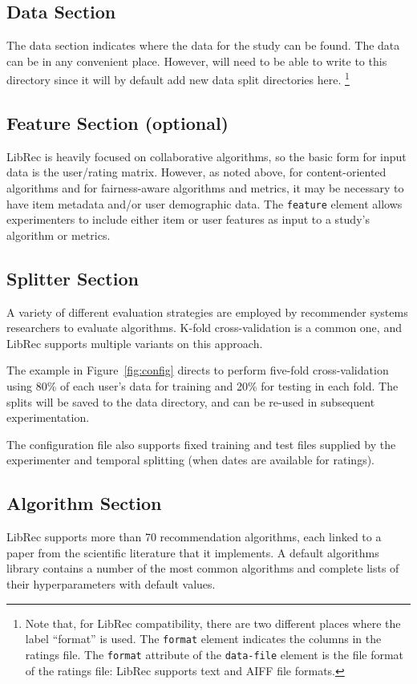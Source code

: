 \subsection{Data Section}
The data section indicates where the data for the study can be found. The data can be in any convenient place. However, \libauto{} will need to be able to write to this directory since it will by default add new data split directories here. \footnote{Note that, for LibRec compatibility, there are two different places where the label ``format'' is used. The \texttt{format} element indicates the columns in the ratings file. The \texttt{format} attribute of the \texttt{data-file} element is the file format of the ratings file: LibRec supports text and AIFF file formats.}

\subsection{Feature Section (optional)}
LibRec is heavily focused on collaborative algorithms, so the basic form for input data is the user/rating matrix. However, as noted above, for content-oriented algorithms and for fairness-aware algorithms and metrics, it may be necessary to have item metadata and/or user demographic data. The \texttt{feature} element allows experimenters to include either item or user features as input to a study's algorithm or metrics. 

\subsection{Splitter Section}
A variety of different evaluation strategies are employed by recommender systems researchers to evaluate algorithms. K-fold cross-validation is a common one, and LibRec supports multiple variants on this approach. 

The example in Figure~\ref{fig:config} directs \libauto{} to perform five-fold cross-validation using 80\% of each user's data for training and 20\% for testing in each fold. The splits will be saved to the data directory, and can be re-used in subsequent experimentation. 

The configuration file also supports fixed training and test files supplied by the experimenter and temporal splitting (when dates are available for ratings). 

\subsection{Algorithm Section}
LibRec supports more than 70 recommendation algorithms, each linked to a paper from the scientific literature that it implements. A default algorithms library contains a number of the most common algorithms and complete lists of their hyperparameters with default values.

